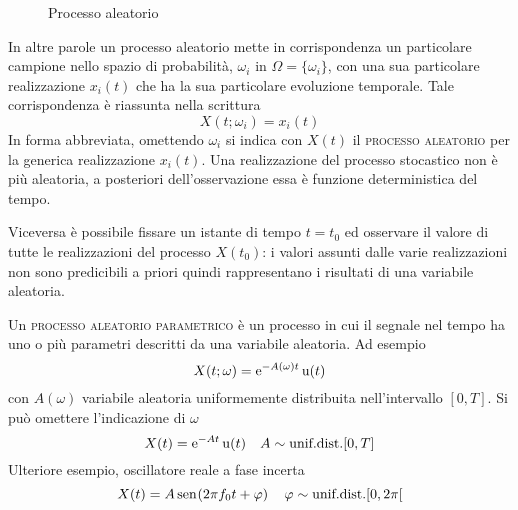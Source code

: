 \begin{figure}[h!]
\caption{Processo aleatorio}
\end{figure}

In altre parole un processo aleatorio mette in corrispondenza un particolare campione nello spazio di probabilità, $\omega_i$ in $\Omega=\{\omega_i\}$, con una sua particolare realizzazione $x_i(t)$ che ha la sua particolare evoluzione temporale. Tale corrispondenza è riassunta nella scrittura
\begin{equation}X(t;\omega_i)=x_i(t)\end{equation}
In forma abbreviata, omettendo $\omega_i$ si indica con $X(t)$ il \textsc{processo aleatorio} per la generica realizzazione $x_i(t)$.
Una realizzazione del processo stocastico non è più aleatoria, a posteriori dell'osservazione essa è funzione deterministica del tempo.

Viceversa è possibile fissare un istante di tempo $t=t_0$ ed osservare il valore di tutte le realizzazioni del processo $X(t_0)$: i valori assunti dalle varie realizzazioni non sono predicibili a priori quindi rappresentano i risultati di una variabile aleatoria.

Un \textsc{processo aleatorio parametrico} è un processo in cui il segnale nel tempo ha uno o più parametri descritti da una variabile aleatoria. Ad esempio
\[X(t;\omega)=\operatorname{e}^{-A(\omega)t}\operatorname{u}(t)\]
con $A(\omega)$ variabile aleatoria uniformemente distribuita nell'intervallo $[0,T]$.
Si può omettere l'indicazione di $\omega$
\[X(t)=\operatorname{e}^{-A t}\operatorname{u}(t)\quad A\sim\text{unif.dist.} [0,T]\]
Ulteriore esempio, oscillatore reale a fase incerta
\[X(t)=A\,{\operatorname{sen}}^{}\!\left({2\pi f_0 t+\varphi}\right)\quad \varphi\sim\text{unif.dist.} [0,2\pi[\]

